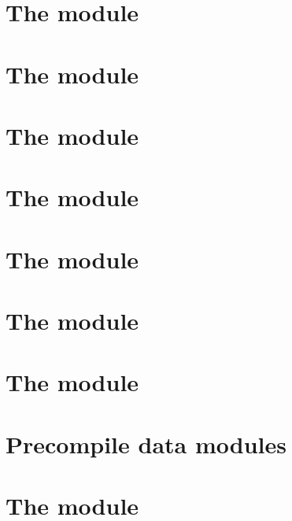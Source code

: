 \documentclass[fleqn]{report}
\begin{document}
\chapter{The \blockHashMod{} module}                 \label{chap: block hash}      \minitoc    
\chapter{The \rlpTxnMod{} module}                    \label{chap: txn rlp}         \minitoc    
\chapter{The \userTxnDataMod{} module}               \label{chap: user txn data}   \minitoc    
\chapter{The \rlpAddrMod{} module}                   \label{chap: addr rlp}        \minitoc    
\chapter{The \rlpTxnRcptMod{} module}                \label{chap: log rlp}         \minitoc    
\chapter{The \logInfoMod{} module}                   \label{chap: log info}        \minitoc    
\chapter{The \logDataMod{} module}                   \label{chap: log data}        \minitoc    
\chapter{Precompile data modules}                    \label{chap: precompile data} \minitoc    
\chapter{The \rlpUtilsMod{} module}                  \label{chap: rlp utils}       \minitoc    
\end{document}
